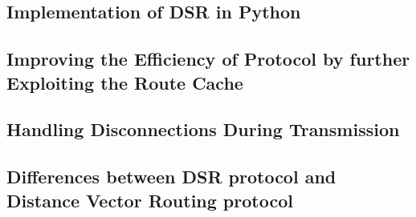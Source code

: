 \documentclass[a4paper,11pt]{article}%
\begin{document}
\subsection{Implementation of DSR in Python}

\subsection{Improving the Efficiency of Protocol by further Exploiting the Route Cache}

\subsection{Handling Disconnections During Transmission}

\subsection{Differences between DSR protocol  and Distance Vector Routing protocol}
\vfill



\end{document}
